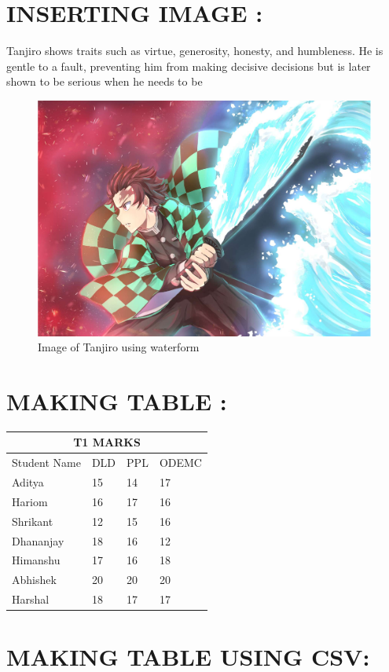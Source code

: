 \documentclass{article}
\begin{document}
\section{\LARGE INSERTING IMAGE :}
Tanjiro shows traits such as virtue, generosity, honesty, and humbleness. He is gentle to a fault, preventing him from making decisive decisions but is later shown to be serious when he needs to be
\begin{figure}[h]
\centering
\includegraphics[scale=0.5]{Demon_Slayer}
\caption{\large Image of Tanjiro using waterform}
\end{figure}

\section{\LARGE MAKING TABLE :}

\begin{tabular}{ ||p{3cm}||p{3cm}||p{3cm}||p{3cm}||  }
 \hline
 \multicolumn{4}{||c||}{\textbf {T1 MARKS}} \\
 \hline
 Student Name & DLD & PPL & ODEMC\\
 \hline
 Aditya   & 15   & 14 & 17\\
 Hariom &   16  & 17   & 16\\
 Shrikant & 12 & 15 &  16\\
 Dhananjay    & 18 & 16 &  12\\
 Himanshu &   17  & 16 & 18\\
 Abhishek  & 20 & 20 & 20\\
 Harshal  & 18 & 17 & 17\\
 \hline
\end{tabular}

\section{\LARGE MAKING TABLE USING  CSV:}
\begin{table}[h]
\begin{center}
\huge{}
\end{center}
\end{table}
\end{document}
